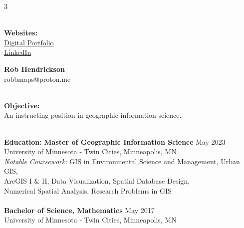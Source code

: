 \documentclass[letterpaper,12pt]{article}
\numberwithin{equation}{section}
\begin{document}
\pagestyle{empty}

	\begin{multicols}{3}
		\begin{center}
			~\\
			\textbf{Websites:}\\
			\href{https://rwhendrickson.github.io/Portfolio/}{Digital Portfolio}\\
			\href{https://www.linkedin.com/in/~rwhendrickson/}{LinkedIn}\\
		\end{center}
		\columnbreak
		\begin{center}
			{\large\textbf{Rob Hendrickson}}\\
			{\small robbmaps@proton.me} \\
		\end{center}
		\columnbreak
		\begin{center}
		~\\
			\textbf{Objective:}\\
			An instructing position in geographic information science.
		\end{center}
	\end{multicols}
 \vspace{-.1in}
 \noindent\makebox[\linewidth]{\rule{\linewidth}{0.4pt}}
	~\\
\textbf{Education:} \hspace*{.2in} \textbf{Master of Geographic Information Science} \hspace*{1.99in} May 2023\\
	\hspace*{1.16in} University of Minnesota - Twin Cities, Minneapolis, MN\\
	\hspace*{1.16in} \textit{Notable Coursework:} GIS in Environmental Science and Management, Urban GIS,\\
	\hspace*{2.72in} ArcGIS I \& II, Data Visualization, Spatial Database Design,\\ \hspace*{2.72in} Numerical Spatial Analysis, Research Problems in GIS
	\\\\
 \hspace*{1.16in} \textbf{Bachelor of Science, Mathematics} \hspace*{2.69in} May 2017\\
	\hspace*{1.16in} University of Minnesota - Twin Cities, Minneapolis, MN\\
\end{document}
